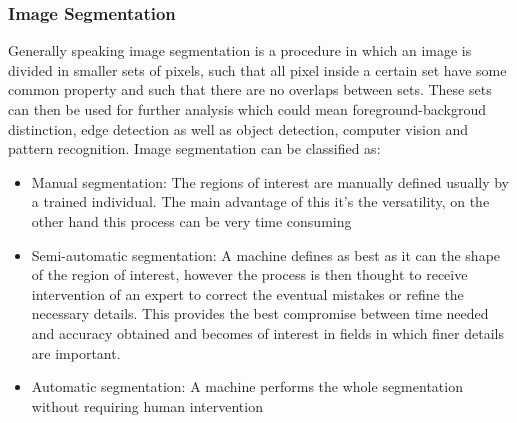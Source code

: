 \subsubsection{Image Segmentation}
Generally speaking image segmentation is a procedure in which an image is divided in smaller sets of pixels, such that all pixel inside a certain set have some common property and such that there are no overlaps between sets. These sets can then be used for further analysis which could mean foreground-backgroud distinction, edge detection as well as object detection, computer vision and pattern recognition. Image segmentation can be classified as:

\begin{itemize}
\item Manual segmentation: The regions of interest are manually defined usually by a trained individual. The main advantage of this it's the versatility, on the other hand this process can be very time consuming
\item Semi-automatic segmentation: A machine defines as best as it can the shape of the region of interest, however the process is then thought to receive intervention of an expert to correct the eventual mistakes or refine the necessary details. This provides the best compromise between time needed and accuracy obtained and becomes of interest in fields in which finer details are important.
\item Automatic segmentation: A machine performs the whole segmentation without requiring human intervention
\end{itemize}

